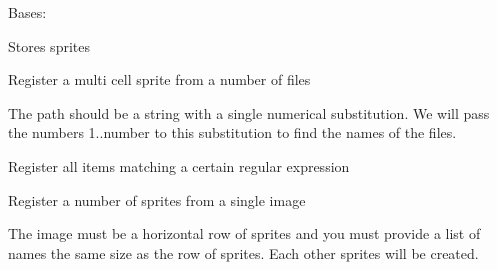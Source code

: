 \documentclass[letterpaper,10pt,english]{sphinxmanual}
\begin{document}
\begin{fulllineitems}
\label{visual:serge.visual.Store}
Bases: {\hyperref[common:serge.registry.GeneralStore]{}}

Stores sprites

\begin{fulllineitems}
\label{visual:serge.visual.Store.registerFromFiles}
Register a multi cell sprite from a number of files

The path should be a string with a single numerical substitution.
We will pass the numbers 1..number to this substitution to find
the names of the files.

\end{fulllineitems}


\begin{fulllineitems}
\label{visual:serge.visual.Store.registerItemsFromPattern}
Register all items matching a certain regular expression

\end{fulllineitems}


\begin{fulllineitems}
\label{visual:serge.visual.Store.registerMultipleItems}
Register a number of sprites from a single image

The image must be a horizontal row of sprites and you must provide
a list of names the same size as the row of sprites. Each other sprites
will be created.

\end{fulllineitems}


\end{fulllineitems}
\end{document}
